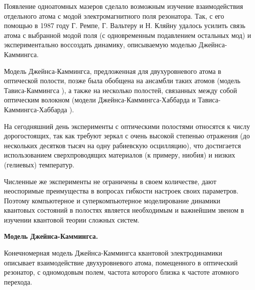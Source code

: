 Появление одноатомных мазеров сделало возможным изучение взаимодействия отдельного атома с модой электромагнитного поля резонатора. Так, с его помощью в 1987 году Г. Ремпе, Г. Вальтеру и Н. Кляйну \cite{rempe} удалось усилить связь атома с выбранной модой поля (с одновременным подавлением остальных мод) и экспериментально воссоздать динамику, описываемую моделью Джейнса-Каммингса.

Модель Джейнса-Каммингса, предложенная для двухуровневого атома в оптической полости, позже была обобщена на ансамбли таких атомов (модель Тависа-Каммингса \cite{tc_exact_solution,tc_a_study}), а также на несколько полостей, связанных между собой оптическим волокном (модели Джейнса-Каммингса-Хаббарда \cite{jch_time_evolution,jch_site_dependent_control,jch_quench_dynamics} и Тависа-Каммингса-Хаббарда \cite{tch_photon_blockade,tch_transfer,tch_quality}).

На сегодняшний день эксперименты с оптическими полостями \cite{cavity_exp_1,cavity_exp_2,cavity_exp_3} относятся к числу дорогостоящих, так как требуют зеркал с очень высокой степенью отражения (до нескольких десятков тысяч на одну рабиевскую осцилляцию), что достигается использованием сверхпроводящих материалов (к примеру, ниобия) и низких (гелиевых) температур.

Численные же эксперименты не ограничены в своем количестве, дают неоспоримые преимущества в вопросах гибкости настроек своих параметров. Поэтому компьютерное и суперкомпьютерное моделирование динамики квантовых состояний в полостях является необходимым и важнейшим звеном в изучении квантовой теории сложных систем.

\clearpage
\indent\textbf{Модель Джейнса-Каммингса.}

Конечномерная модель Джейнса-Каммингса квантовой электродинамики описывает взаимодействие двухуровневого атома, помещенного в оптический резонатор, с одномодовым полем, частота которого близка к частоте атомного перехода.

\begin{figure}[h!]
	\noindent{}
\end{figure}

